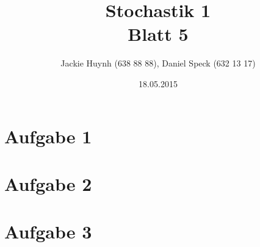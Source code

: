 \documentclass[10pt,a4paper]{article}
\title{\textbf{\huge Stochastik 1
\\\large Blatt 5}}
\author{Jackie Huynh (638 88 88), Daniel Speck (632 13 17)}
\date{18.05.2015}
\begin{document}
	\maketitle



	\section*{Aufgabe 1}
	
		
		
	\section*{Aufgabe 2}
	
	\newpage
	
	\section*{Aufgabe 3}
	
\end{document}
